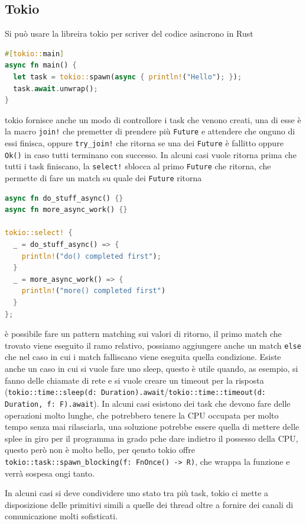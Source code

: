 \documentclass[12pt]{article}
\begin{document}
\subsection{Tokio}
Si pu\`o usare la libreira tokio per scriver del codice asincrono in Rust
\begin{lstlisting}[language=rust]
#[tokio::main]
async fn main() {
  let task = tokio::spawn(async { println!("Hello"); });
  task.await.unwrap();
}
\end{lstlisting}
tokio fornisce anche un modo di controllore i task che venono creati, una di esse \`e la macro \texttt{join!} che premetter di prendere pi\`u \texttt{Future} e attendere che onguno di essi finisca, oppure \texttt{try\_join!} che ritorna se una dei \texttt{Future} \`e fallitto oppure \texttt{Ok()} in caso tutti terminano con successo. In alcuni casi vuole ritorna prima che tutti i task finiscano, la \texttt{select!} sblocca al primo \texttt{Future} che ritorna, che permette di fare un match su quale dei \texttt{Future} ritorna
\begin{lstlisting}[language=rust]
async fn do_stuff_async() {}
async fn more_async_work() {}

tokio::select! {
  _ = do_stuff_async() => {
    println!("do() completed first");
  }
  _ = more_async_work() => {
    println!("more() completed first")
  }
};
\end{lstlisting}
\`e possibile fare un pattern matching sui valori di ritorno, il primo match che trovato viene eseguito il ramo relativo, possiamo aggiungere anche un match \texttt{else} che nel caso in cui i match falliscano viene eseguita quella condizione. Esiste anche un caso in cui si vuole fare uno sleep, questo \`e utile quando, as esempio, si fanno delle chiamate di rete e si vuole creare un timeout per la risposta (\texttt{tokio::time::sleep(d: Duration).await}/\texttt{tokio::time::timeout(d: Duration, f: F).await}). In alcuni casi esistono dei task che devono fare delle operazioni molto lunghe, che potrebbero tenere la CPU occupata per molto tempo senza mai rilasciarla, una soluzione potrebbe essere quella di mettere delle splee in giro per il programma in grado pche dare indietro il possesso della CPU, questo per\`o non \`e molto bello, per qeusto tokio offre \texttt{tokio::task::spawn\_blocking(f: FnOnce() -> R)}, che wrappa la funzione e verr\`a sospesa ongi tanto.

In alcuni casi si deve condividere uno stato tra pi\`u task, tokio ci mette a disposizione delle primitivi simili a quelle dei thread oltre a fornire dei canali di comunicazione molti sofisticati.
\end{document}
